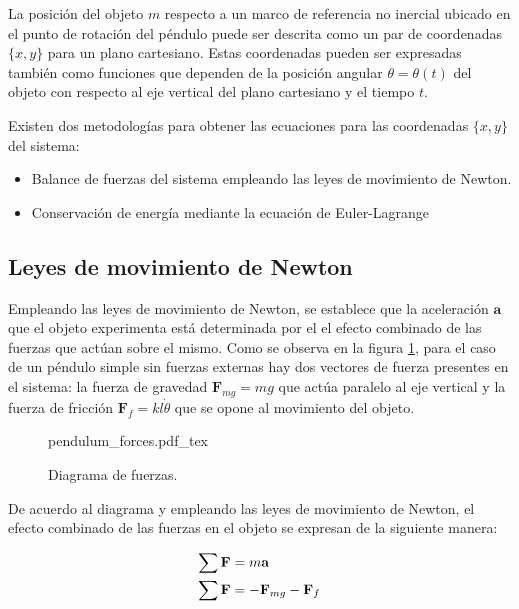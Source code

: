 
La posición del objeto $m$ respecto a un marco de referencia no inercial
ubicado en el punto de rotación del péndulo puede ser descrita como un par
de coordenadas $\{x, y\}$ para un plano cartesiano. Estas coordenadas pueden
ser expresadas también como funciones que dependen de la posición angular 
$\theta = \theta(t)$ del objeto con respecto al eje vertical del plano cartesiano y el
tiempo $t$.

Existen dos metodologías para obtener las ecuaciones para las coordenadas 
$\{x, y\}$ del sistema:
\begin{itemize}
 \item Balance de fuerzas del sistema empleando las leyes de 
 movimiento de Newton.
 \item Conservación de energía mediante la ecuación de Euler-Lagrange
\end{itemize}




\subsection{Leyes de movimiento de Newton}

Empleando las leyes de movimiento de Newton, 
se establece que la aceleración $\textbf{a}$ que el objeto
experimenta está determinada por el el
efecto combinado de las fuerzas que actúan sobre el mismo.
Como se observa en la figura \ref{fig: pendulum forces}, 
para el caso de un péndulo simple sin fuerzas externas 
hay dos vectores de fuerza presentes en el sistema:
la fuerza de gravedad $\textbf{F}_{mg} = mg$ que actúa paralelo al eje vertical 
y la fuerza de fricción $\textbf{F}_f = kl\dot{\theta}$ que se opone al movimiento del objeto. 

 \begin{figure}[ht]
    \centering
    {pendulum_forces.pdf_tex}
    \caption{Diagrama de fuerzas.}
    \label{fig: pendulum forces}
\end{figure}

De acuerdo al diagrama y empleando las leyes de movimiento de Newton, 
el efecto combinado de las fuerzas en el objeto se expresan de la 
siguiente manera:


\begin{equation}
 \begin{split}
  \sum \textbf{F} & = m \textbf{a}\\
  \sum \bold{F} & = - \bold{F}_{mg} - \bold{F}_f
 \end{split}
 \label{eq: }
\end{equation}

